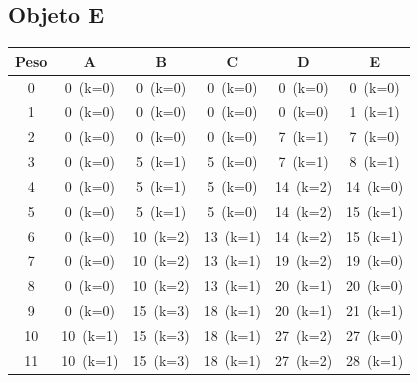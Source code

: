 \documentclass[12pt]{article}
\begin{document}
\begin{landscape}
\subsection*{Objeto E}
\begin{longtable}{cccccc}
\toprule
Peso & A & B & C & D & E \\
\midrule
0 & \cellcolor{red!20}0~(k=0) & \cellcolor{red!20}0~(k=0) & \cellcolor{red!20}0~(k=0) & \cellcolor{red!20}0~(k=0) & \cellcolor{red!20}0~(k=0) \\
1 & \cellcolor{red!20}0~(k=0) & \cellcolor{red!20}0~(k=0) & \cellcolor{red!20}0~(k=0) & \cellcolor{red!20}0~(k=0) & \cellcolor{green!40}1~(k=1) \\
2 & \cellcolor{red!20}0~(k=0) & \cellcolor{red!20}0~(k=0) & \cellcolor{red!20}0~(k=0) & \cellcolor{green!40}7~(k=1) & \cellcolor{red!20}7~(k=0) \\
3 & \cellcolor{red!20}0~(k=0) & \cellcolor{green!40}5~(k=1) & \cellcolor{red!20}5~(k=0) & \cellcolor{green!40}7~(k=1) & \cellcolor{green!40}8~(k=1) \\
4 & \cellcolor{red!20}0~(k=0) & \cellcolor{green!40}5~(k=1) & \cellcolor{red!20}5~(k=0) & \cellcolor{green!40}14~(k=2) & \cellcolor{red!20}14~(k=0) \\
5 & \cellcolor{red!20}0~(k=0) & \cellcolor{green!40}5~(k=1) & \cellcolor{red!20}5~(k=0) & \cellcolor{green!40}14~(k=2) & \cellcolor{green!40}15~(k=1) \\
6 & \cellcolor{red!20}0~(k=0) & \cellcolor{green!40}10~(k=2) & \cellcolor{green!40}13~(k=1) & \cellcolor{green!40}14~(k=2) & \cellcolor{green!40}15~(k=1) \\
7 & \cellcolor{red!20}0~(k=0) & \cellcolor{green!40}10~(k=2) & \cellcolor{green!40}13~(k=1) & \cellcolor{green!40}19~(k=2) & \cellcolor{red!20}19~(k=0) \\
8 & \cellcolor{red!20}0~(k=0) & \cellcolor{green!40}10~(k=2) & \cellcolor{green!40}13~(k=1) & \cellcolor{green!40}20~(k=1) & \cellcolor{yellow!50}20~(k=0) \\
9 & \cellcolor{red!20}0~(k=0) & \cellcolor{green!40}15~(k=3) & \cellcolor{green!40}18~(k=1) & \cellcolor{green!40}20~(k=1) & \cellcolor{green!40}21~(k=1) \\
10 & \cellcolor{green!40}10~(k=1) & \cellcolor{green!40}15~(k=3) & \cellcolor{green!40}18~(k=1) & \cellcolor{green!40}27~(k=2) & \cellcolor{red!20}27~(k=0) \\
11 & \cellcolor{green!40}10~(k=1) & \cellcolor{green!40}15~(k=3) & \cellcolor{green!40}18~(k=1) & \cellcolor{green!40}27~(k=2) & \cellcolor{green!40}28~(k=1) \\

\end{longtable}
\end{landscape}
\end{document}
